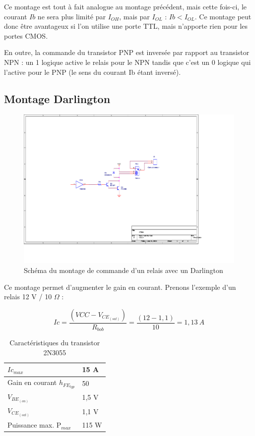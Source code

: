 \documentclass[a4paper]{article}
\begin{document}
Ce montage est tout à fait analogue au montage précédent, mais cette fois-ci, le courant $Ib$ ne sera plus limité par $I_{OH}$, mais par $I_{OL}$ : $Ib < I_{OL}$. Ce montage peut donc être avantageux si l'on utilise une porte \ac{TTL}, mais n'apporte rien pour les portes \ac{CMOS}.

En outre, la commande du transistor PNP est inversée par rapport au transistor NPN : un 1 logique active le relais pour le NPN tandis que c'est un 0 logique qui l'active pour le PNP (le sens du courant Ib étant inversé).

\subsection{Montage Darlington}

\begin{figure}[H]
	\centering
	\includegraphics[scale=1.00]{Images/Montage_commande_relais_Darlington}
	\caption{Schéma du montage de commande d'un relais avec un Darlington
		\label{Montage_commande_relais_Darlington}}
\end{figure}

Ce montage permet d'augmenter le gain en courant. Prenons l'exemple d'un relais 12 V / 10 $\Omega$ :

\[Ic = \frac{(VCC - V_{CE_{(sat)}})}{R_{bob}} = \frac{(12 - 1,1)}{10} = 1,13\ A\]

\begin{table}[H]
	\centering
	\begin{tabular}{|l|l|}\hline
			$Ic_{max}$ & 15 A\\\hline
			Gain en courant $h_{FE_{typ}}$ & 50\\\hline
			$V_{BE_{(on)}}$ & 1,5 V\\\hline
			$V_{CE_{(sat)}}$ & 1,1 V\\\hline
			Puissance max. P$_{max}$ & 115 W\\\hline
	\end{tabular}
	\caption{Caractéristiques du transistor 2N3055 \cite{2N3055}
		\label{Caracteristiques_du_transistor_2N3055}}
\end{table}
\end{document}
